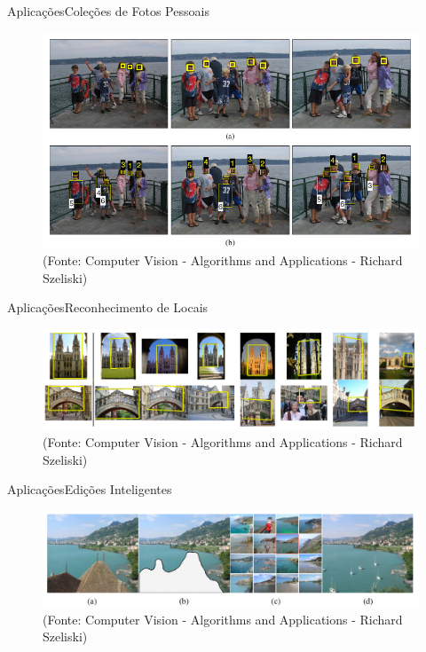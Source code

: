 \begin{frame}{Aplicações}{Coleções de Fotos Pessoais}

\begin{figure}
    \centering
    \includegraphics[scale=.3]{img/personal_collection.png}
    \\ (Fonte: Computer Vision - Algorithms and Applications - Richard Szeliski)
    \label{fig:personal_collection}
\end{figure}

\end{frame}

\begin{frame}{Aplicações}{Reconhecimento de Locais}

\begin{figure}
    \centering
    \includegraphics[scale=.3]{img/location_recognition.png}
    \\ (Fonte: Computer Vision - Algorithms and Applications - Richard Szeliski)
    \label{fig:location_recognition}
\end{figure}

\end{frame}

\begin{frame}{Aplicações}{Edições Inteligentes}

\begin{figure}
    \centering
    \includegraphics[scale=.28]{img/smart_editing.png}
    \\ (Fonte: Computer Vision - Algorithms and Applications - Richard Szeliski)
    \label{fig:smart_editing}
\end{figure}

\end{frame}

